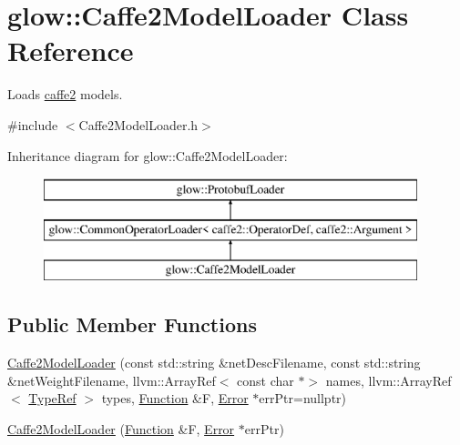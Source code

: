 \hypertarget{classglow_1_1_caffe2_model_loader}{}\section{glow\+:\+:Caffe2\+Model\+Loader Class Reference}
\label{classglow_1_1_caffe2_model_loader}


Loads \hyperlink{namespacecaffe2}{caffe2} models.  




{\ttfamily \#include $<$Caffe2\+Model\+Loader.\+h$>$}

Inheritance diagram for glow\+:\+:Caffe2\+Model\+Loader\+:\begin{figure}[H]
\begin{center}
\leavevmode
\includegraphics[height=3.000000cm]{classglow_1_1_caffe2_model_loader}
\end{center}
\end{figure}
\subsection*{Public Member Functions}
\begin{DoxyCompactItemize}
\item 
\hyperlink{classglow_1_1_caffe2_model_loader_a1b5e4ecb2ee703dbb2656e953c7a6146}{Caffe2\+Model\+Loader} (const std\+::string \&net\+Desc\+Filename, const std\+::string \&net\+Weight\+Filename, llvm\+::\+Array\+Ref$<$ const char $\ast$$>$ names, llvm\+::\+Array\+Ref$<$ \hyperlink{structglow_1_1_type}{Type\+Ref} $>$ types, \hyperlink{classglow_1_1_function}{Function} \&F, \hyperlink{namespaceglow_afdb176c3a672ef66db0ecfc19a8d39bf}{Error} $\ast$err\+Ptr=nullptr)
\item 
\hyperlink{classglow_1_1_caffe2_model_loader_a7d346f6d6f2339138d94a001fc344938}{Caffe2\+Model\+Loader} (\hyperlink{classglow_1_1_function}{Function} \&F, \hyperlink{namespaceglow_afdb176c3a672ef66db0ecfc19a8d39bf}{Error} $\ast$err\+Ptr)
\end{DoxyCompactItemize}
